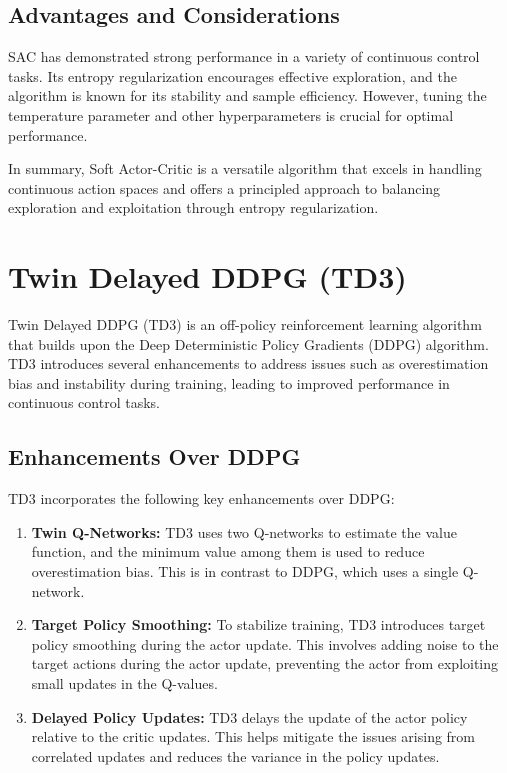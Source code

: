 \documentclass[conference]{IEEEtran}
\begin{document}
\subsection{Advantages and Considerations}

SAC has demonstrated strong performance in a variety of continuous control tasks. Its entropy regularization encourages effective exploration, and the algorithm is known for its stability and sample efficiency. However, tuning the temperature parameter and other hyperparameters is crucial for optimal performance.

In summary, Soft Actor-Critic is a versatile algorithm that excels in handling continuous action spaces and offers a principled approach to balancing exploration and exploitation through entropy regularization.

\section{Twin Delayed DDPG (TD3)}

Twin Delayed DDPG (TD3) is an off-policy reinforcement learning algorithm that builds upon the Deep Deterministic Policy Gradients (DDPG) algorithm. TD3 introduces several enhancements to address issues such as overestimation bias and instability during training, leading to improved performance in continuous control tasks.

\subsection{Enhancements Over DDPG}

TD3 incorporates the following key enhancements over DDPG:

\begin{enumerate}
  \item \textbf{Twin Q-Networks:} TD3 uses two Q-networks to estimate the value function, and the minimum value among them is used to reduce overestimation bias. This is in contrast to DDPG, which uses a single Q-network.

  \item \textbf{Target Policy Smoothing:} To stabilize training, TD3 introduces target policy smoothing during the actor update. This involves adding noise to the target actions during the actor update, preventing the actor from exploiting small updates in the Q-values.

  \item \textbf{Delayed Policy Updates:} TD3 delays the update of the actor policy relative to the critic updates. This helps mitigate the issues arising from correlated updates and reduces the variance in the policy updates.

\end{enumerate}
\end{document}
